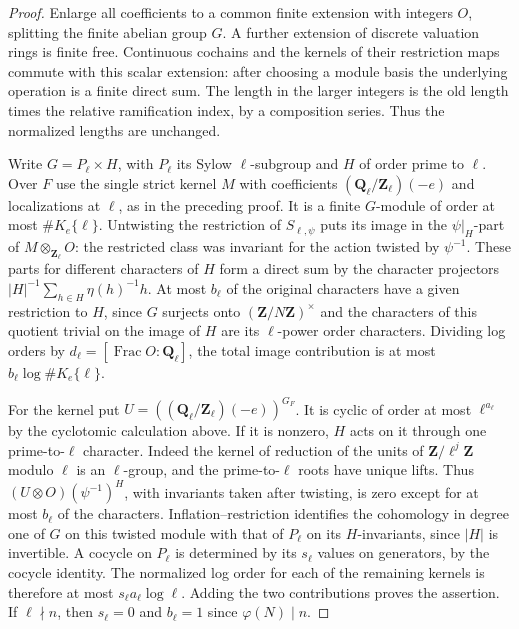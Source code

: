 \begin{proof}
Enlarge all coefficients to a common finite extension with integers
\(O\), splitting the finite abelian group \(G\). A further extension
of discrete valuation rings is finite free. Continuous cochains and
the kernels of their restriction maps commute with this scalar
extension: after choosing a module basis the underlying operation
is a finite direct sum. The length in the larger integers is the
old length times the relative ramification index, by a composition
series. Thus the normalized lengths are unchanged.

Write \(G=P_\ell\times H\), with \(P_\ell\) its Sylow \(\ell\)-subgroup
and \(H\) of order prime to \(\ell\). Over \(F\) use the single strict
kernel \(M\) with coefficients \((\mathbf Q_\ell/\mathbf Z_\ell)(-e)\)
and localizations at \(\ell\), as in the preceding proof.
It is a finite \(G\)-module of order at most \(\#K_e\{\ell\}\).
Untwisting the restriction of \(S_{\ell,\psi}\) puts its image in
the \(\psi|_H\)-part of \(M\otimes_{\mathbf Z_\ell}O\): the restricted
class was invariant for the action twisted by \(\psi^{-1}\).
These parts for different characters of \(H\) form a direct sum
by the character projectors \( |H|^{-1}\sum_{h\in H}\eta(h)^{-1}h\).
At most \(b_\ell\) of the original characters have a given restriction
to \(H\), since \(G\) surjects onto \((\mathbf Z/N\mathbf Z)^\times\)
and the characters of this quotient trivial on the image of \(H\)
are its \(\ell\)-power order characters. Dividing log orders by
\(d_\ell=[\operatorname{Frac}O:\mathbf Q_\ell]\), the total image
contribution is at most \(b_\ell\log\#K_e\{\ell\}\).

For the kernel put \(U=((\mathbf Q_\ell/\mathbf Z_\ell)(-e))^{G_F}\).
It is cyclic of order at most \(\ell^{a_\ell}\) by the cyclotomic
calculation above. If it is nonzero, \(H\) acts on it through one
prime-to-\(\ell\) character. Indeed the kernel of reduction of the
units of \(\mathbf Z/\ell^j\mathbf Z\) modulo \(\ell\) is an
\(\ell\)-group, and the prime-to-\(\ell\) roots have unique lifts.
Thus \((U\otimes O)(\psi^{-1})^H\), with invariants taken after
twisting, is zero except for at most \(b_\ell\) of the characters.
Inflation--restriction identifies the cohomology in degree one of
\(G\) on this twisted module with that of \(P_\ell\) on its
\(H\)-invariants, since \(|H|\) is invertible. A cocycle on \(P_\ell\)
is determined by its \(s_\ell\) values on generators, by the cocycle
identity. The normalized log order for each of the remaining kernels
is therefore at most \(s_\ell a_\ell\log\ell\). Adding the two
contributions proves the assertion. If \(\ell\nmid n\), then
\(s_\ell=0\) and \(b_\ell=1\) since \(\varphi(N)\mid n\).
\end{proof}


